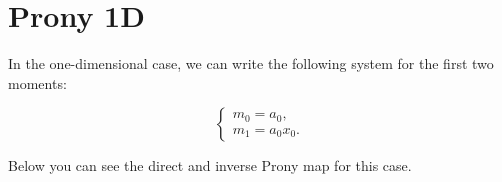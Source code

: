 \section{Prony 1D}
In the one-dimensional case, we can write the following system for the first two moments:

$$
\begin{cases}
m_0 = a_0, \\
m_1 = a_0 x_0.
\end{cases}
$$
  
Below you can see the direct and inverse Prony map for this case. 